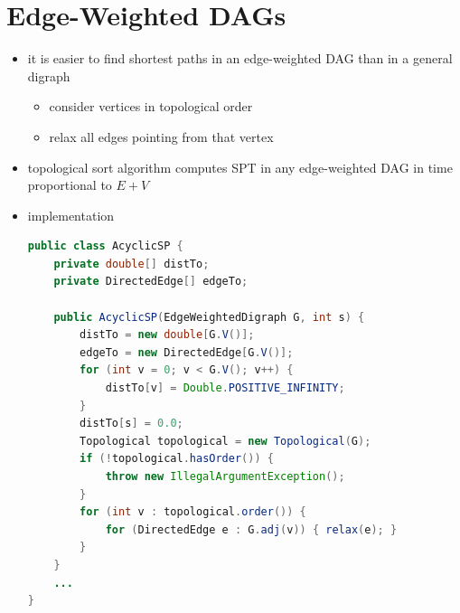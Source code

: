 \documentclass[8pt,a4paper,compress]{beamer}
\begin{document}
\section{Edge-Weighted DAGs}
\begin{frame}[fragile]
\begin{itemize}
\item it is easier to find shortest paths in an edge-weighted DAG than in a general digraph
\begin{itemize}
\item consider vertices in topological order

\item relax all edges pointing from that vertex
\end{itemize}

\item topological sort algorithm computes SPT in any edge-weighted DAG in time proportional to $E + V$

\item implementation
\begin{lstlisting}[language=Java]
public class AcyclicSP {
    private double[] distTo; 
    private DirectedEdge[] edgeTo; 
    
    public AcyclicSP(EdgeWeightedDigraph G, int s) {
        distTo = new double[G.V()];
        edgeTo = new DirectedEdge[G.V()];
        for (int v = 0; v < G.V(); v++) {
            distTo[v] = Double.POSITIVE_INFINITY;
        }
        distTo[s] = 0.0;
        Topological topological = new Topological(G);
        if (!topological.hasOrder()) { 
            throw new IllegalArgumentException(); 
        }
        for (int v : topological.order()) {
            for (DirectedEdge e : G.adj(v)) { relax(e); }
        }
    }
    ...
}
\end{lstlisting}
\end{itemize}
\end{frame}
\end{document}

